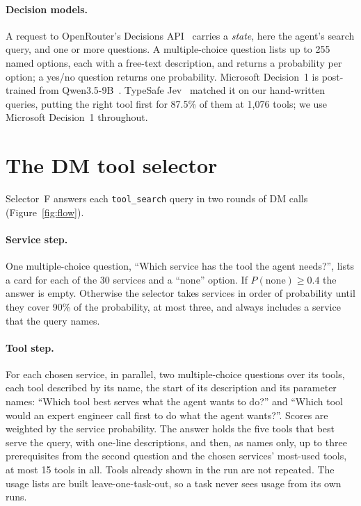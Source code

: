 \documentclass[11pt]{article}
\newcommand{\msd}{Microsoft Decision~1}
\begin{document}
\paragraph{Decision models.} A request to OpenRouter's Decisions API~\citep{openrouterdecisions} carries a
\emph{state}, here the agent's search query, and one or more questions. A multiple-choice question lists up to 255
named options, each with a free-text description, and returns a probability per option; a yes/no question returns one
probability. \msd{} is post-trained from Qwen3.5-9B~\citep{msd1}. TypeSafe Jev~\citep{typesafejev} matched it on our
hand-written queries, putting the right tool first for 87.5\% of them at 1{,}076 tools; we use \msd{} throughout.

\section{The DM tool selector}\label{sec:selector}
Selector~F answers each \texttt{tool\_search} query in two rounds of DM calls (Figure~\ref{fig:flow}).

\paragraph{Service step.} One multiple-choice question, ``Which service has the tool the agent needs?'', lists a card
for each of the 30 services and a ``none'' option. If $P(\text{none})\ge 0.4$ the answer is empty. Otherwise the
selector takes services in order of probability until they cover 90\% of the probability, at most three, and always
includes a service that the query names.

\paragraph{Tool step.} For each chosen service, in parallel, two multiple-choice questions over its tools, each tool
described by its name, the start of its description and its parameter names: ``Which tool best serves what the agent
wants to do?'' and ``Which tool would an expert engineer call first to do what the agent wants?''. Scores are weighted
by the service probability. The answer holds the five tools that best serve the query, with one-line descriptions,
and then, as names only, up to three prerequisites from the second question and the chosen services' most-used tools,
at most 15 tools in all. Tools already shown in the run are not repeated. The usage lists are built leave-one-task-out,
so a task never sees usage from its own runs.
\end{document}

